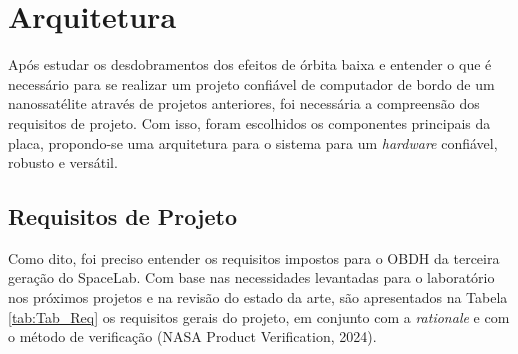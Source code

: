 \chapter{Arquitetura}

Após estudar os desdobramentos dos efeitos de órbita baixa e entender o que é necessário para se realizar um projeto confiável de computador de bordo de um nanossatélite através de projetos anteriores, foi necessária a compreensão dos requisitos de projeto. Com isso, foram escolhidos os componentes principais da placa, propondo-se uma arquitetura para o sistema para um \textit{hardware} confiável, robusto e versátil.  

\section{Requisitos de Projeto}

Como dito, foi preciso entender os requisitos impostos para o OBDH da terceira geração do SpaceLab. Com base nas necessidades levantadas para o laboratório nos próximos projetos e na revisão do estado da arte, são apresentados na Tabela \ref{tab:Tab_Req} os requisitos gerais do projeto, em conjunto com a \textit{rationale} e com o método de verificação (NASA Product Verification, 2024). 

